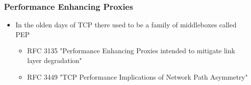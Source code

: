 \begin{frame}
  \frametitle{Performance Enhancing Proxies}
  \begin{itemize}
    \item In the olden days of TCP there used to be a family of middleboxes called PEP
    \begin{itemize}
      \item RFC 3135 "Performance Enhancing Proxies intended to mitigate link layer degradation"
      \item RFC 3449 "TCP Performance Implications of Network Path Asymmetry"
    \end{itemize}
  \end{itemize}
\end{frame}
